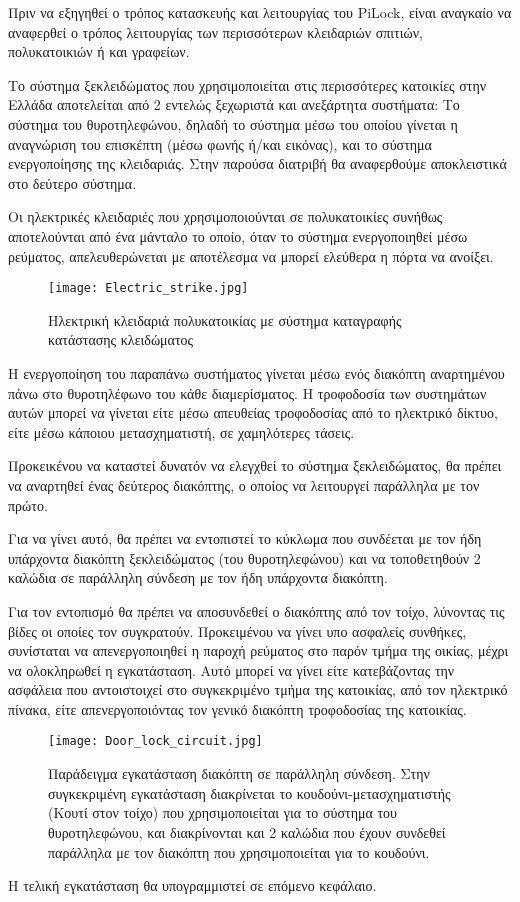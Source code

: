 \label{ch:unlock_mechanism}
Πριν να εξηγηθεί ο τρόπος κατασκευής και λειτουργίας του PiLock, είναι αναγκαίο να αναφερθεί ο τρόπος λειτουργίας των περισσότερων κλειδαριών σπιτιών, πολυκατοικιών ή και γραφείων.

Το σύστημα ξεκλειδώματος που χρησιμοποιείται στις περισσότερες κατοικίες στην Ελλάδα αποτελείται από 2 εντελώς ξεχωριστά και ανεξάρτητα συστήματα: Το σύστημα του θυροτηλεφώνου, δηλαδή το σύστημα μέσω του οποίου γίνεται η αναγνώριση του επισκέπτη (μέσω φωνής ή/και εικόνας), και το σύστημα ενεργοποίησης της κλειδαριάς. Στην παρούσα διατριβή θα αναφερθούμε αποκλειστικά στο δεύτερο σύστημα.

Οι ηλεκτρικές κλειδαριές που χρησιμοποιούνται σε πολυκατοικίες συνήθως αποτελούνται από ένα μάνταλο το οποίο, όταν το σύστημα ενεργοποιηθεί μέσω ρεύματος, απελευθερώνεται με αποτέλεσμα να μπορεί ελεύθερα η πόρτα να ανοίξει.

\begin{figure}[h]
	\centering
		\texttt{[image: Electric\_strike.jpg]}
	\caption{Ηλεκτρική κλειδαριά πολυκατοικίας με σύστημα καταγραφής κατάστασης κλειδώματος}
\end{figure}

Η ενεργοποίηση του παραπάνω συστήματος γίνεται μέσω ενός διακόπτη αναρτημένου πάνω στο θυροτηλέφωνο του κάθε διαμερίσματος. Η τροφοδοσία των συστημάτων αυτών μπορεί να γίνεται είτε μέσω απευθείας τροφοδοσίας από το ηλεκτρικό δίκτυο, είτε μέσω κάποιου μετασχηματιστή, σε χαμηλότερες τάσεις.

Προκεικένου να καταστεί δυνατόν να ελεγχθεί το σύστημα ξεκλειδώματος, θα πρέπει να αναρτηθεί ένας δεύτερος διακόπτης, ο οποίος να λειτουργεί παράλληλα με τον πρώτο.  %

Για να γίνει αυτό, θα πρέπει να εντοπιστεί το κύκλωμα που συνδέεται με τον ήδη υπάρχοντα διακόπτη ξεκλειδώματος (του θυροτηλεφώνου) και να τοποθετηθούν 2 καλώδια σε παράλληλη σύνδεση με τον ήδη υπάρχοντα διακόπτη.

Για τον εντοπισμό θα πρέπει να αποσυνδεθεί ο διακόπτης από τον τοίχο, λύνοντας τις βίδες οι οποίες τον συγκρατούν. Προκειμένου να γίνει υπο ασφαλείς συνθήκες, συνίσταται να απενεργοποιηθεί η παροχή ρεύματος στο παρόν τμήμα της οικίας, μέχρι να ολοκληρωθεί η εγκατάσταση. Αυτό μπορεί να γίνει είτε κατεβάζοντας την ασφάλεια που αντοιστοιχεί στο συγκεκριμένο τμήμα της κατοικίας, από τον ηλεκτρικό πίνακα, είτε απενεργοποιόντας τον γενικό διακόπτη τροφοδοσίας της κατοικίας.

\begin{figure}[h]
	\centering
		\texttt{[image: Door\_lock\_circuit.jpg]}
	\caption{Παράδειγμα εγκατάσταση διακόπτη σε παράλληλη σύνδεση. Στην συγκεκριμένη εγκατάσταση διακρίνεται το κουδούνι-μετασχηματιστής (Κουτί στον τοίχο) που χρησιμοποιείται για το σύστημα του θυροτηλεφώνου, και διακρίνονται και 2 καλώδια που έχουν συνδεθεί παράλληλα με τον διακόπτη που χρησιμοποιείται για το κουδούνι.}
\end{figure}

Η τελική εγκατάσταση θα υπογραμμιστεί σε επόμενο κεφάλαιο.